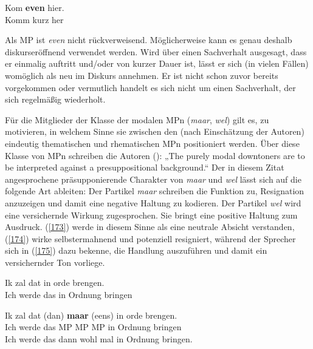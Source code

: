 \begin{exe}
	\ex\label{172} 
	\gll Kom \textbf{even} hier.\\
	 Komm kurz her\\
	 \glt
\hfill\hbox{\citet[54]{Vriendt1991}}
\end{exe}
Als MP ist \textit{even} nicht rückverweisend. Möglicherweise kann es genau deshalb diskurseröffnend verwendet werden. Wird über einen Sachverhalt ausgesagt, dass er einmalig auftritt und/oder von kurzer Dauer ist, lässt er sich (in vielen Fällen) womöglich als neu im Diskurs annehmen. Er ist nicht schon zuvor bereits vorgekommen oder vermutlich handelt es sich nicht um einen Sachverhalt, der sich regelmäßig wiederholt. 

Für die Mitglieder der Klasse der modalen MPn (\textit{maar}, \textit{wel}) gilt es, zu motivieren, in welchem Sinne sie zwischen den (nach Einschätzung der Autoren) eindeutig thematischen und rhematischen MPn positioniert werden. Über diese Klasse von MPn schreiben die Autoren (\citeyear[58]{Vriendt1991}): „The purely modal downtoners are to be interpreted against a presuppositional background.“  Der in diesem Zitat angesprochene präsupponierende  Charakter von \textit{maar} und \textit{wel} lässt sich auf die folgende Art ableiten: Der Partikel \textit{maar} schreiben \citet{Vriendt1991} die Funktion zu, Resignation anzuzeigen und damit eine negative Haltung zu kodieren. Der Partikel \textit{wel} wird eine versichernde Wirkung zugesprochen. Sie bringt eine positive Haltung zum Ausdruck. (\ref{173}) werde in diesem Sinne als eine neutrale Absicht verstanden, (\ref{174}) wirke selbstermahnend und potenziell resigniert, während der Sprecher sich in (\ref{175}) dazu bekenne, die Handlung auszuführen und damit ein versichernder Ton vorliege.

\begin{exe}
	\ex\label{173} 
	\gll Ik zal dat in orde brengen.\\
	 Ich werde das in Ordnung bringen \\
\end{exe}

\begin{exe}
	\ex\label{174} 
	\gll Ik zal dat (dan) \textbf{maar} (eens) in orde brengen.\\
	 Ich werde das MP MP MP in Ordnung bringen \\
	 \glt Ich werde das dann wohl mal in Ordnung bringen. 
\end{exe}

